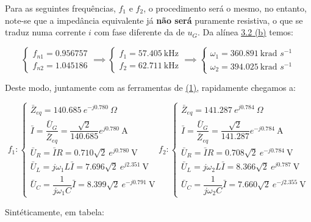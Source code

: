 Para as seguintes frequências, $f_1$ e $f_2$, o procedimento será o mesmo, no entanto, note-se que a impedância equivalente já \textbf{não será} puramente resistiva, o que se traduz numa corrente $i$ com fase diferente da de $u_G$. Da alínea \hyperref[subsubsec_b]{\underline{3.2} (b)} temos:

$$
\begin{cases}
    f_{n1} = 0.956757\\
    f_{n2} = 1.045186
\end{cases}
\implies
\begin{cases}
    f_1 = 57.405\ \text{kHz}\\
    f_2 = 62.711\ \text{kHz}
\end{cases}
\implies
\begin{cases}
    \omega_1 = 360.891\ \text{krad\ $s^{-1}$}\\
    \omega_2 = 394.025\ \text{krad\ $s^{-1}$}
\end{cases}
$$

\clearpage
Deste modo, juntamente com as ferramentas de \hyperref[eq1]{(1)}, rapidamente chegamos a:

$$
f_1 :
\begin{cases}
    \bar{Z}_{eq} = 140.685\ e^{-j 0.780}\ \Omega\\
    \bar{I} = \dfrac{\bar{U}_G}{\bar{Z}_{eq}} =  \dfrac{\sqrt{2}}{140.685}e^{j0.780}\ \text{A}\\
    \bar{U}_R = \bar{I}R = 0.710\sqrt{2}\ e^{j0.780}\ \text{V}\\
    \bar{U}_L = j\omega_1 L \bar{I} = 7.696\sqrt{2}\ e^{j2.351}\ \text{V}\\
    \bar{U}_C = \dfrac{1}{j\omega_1 C}\bar{I} = 8.399\sqrt{2}\ e^{-j0.791}\ \text{V}
\end{cases}
f_2 :
\begin{cases}
    \bar{Z}_{eq} = 141.287\ e^{j0.784}\ \Omega\\    
    \bar{I} = \dfrac{\bar{U}_G}{\bar{Z}_{eq}} = \dfrac{\sqrt{2}}{141.287}e^{-j0.784}\ \text{A}\\
    \bar{U}_R = \bar{I}R = 0.708\sqrt{2}\ e^{-j0.784}\ \text{V}\\
    \bar{U}_L = j\omega_2 L \bar{I} = 8.366\sqrt{2}\ e^{j0.787}\ \text{V}\\
    \bar{U}_C = \dfrac{1}{j\omega_2 C}\bar{I} = 7.660\sqrt{2}\ e^{-j2.355}\ \text{V}
\end{cases}
$$

Sintéticamente, em tabela:

